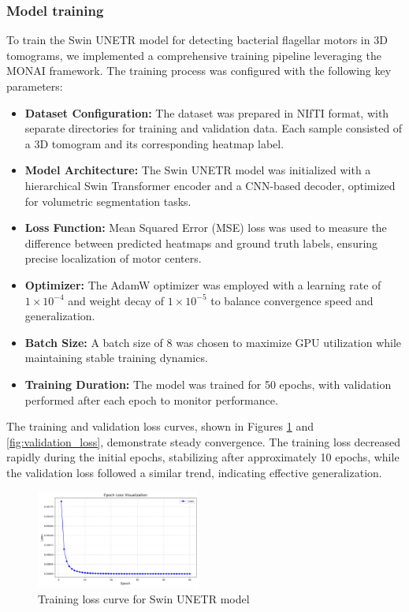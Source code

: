 \documentclass{article}
\begin{document}
\subsubsection{Model training}
To train the Swin UNETR model for detecting bacterial flagellar motors in 3D tomograms, we implemented a comprehensive training pipeline leveraging the MONAI framework. The training process was configured with the following key parameters:

\begin{itemize}
    \item \textbf{Dataset Configuration:} The dataset was prepared in NIfTI format, with separate directories for training and validation data. Each sample consisted of a 3D tomogram and its corresponding heatmap label.
    \item \textbf{Model Architecture:} The Swin UNETR model was initialized with a hierarchical Swin Transformer encoder and a CNN-based decoder, optimized for volumetric segmentation tasks.
    \item \textbf{Loss Function:} Mean Squared Error (MSE) loss was used to measure the difference between predicted heatmaps and ground truth labels, ensuring precise localization of motor centers.
    \item \textbf{Optimizer:} The AdamW optimizer was employed with a learning rate of $1 \times 10^{-4}$ and weight decay of $1 \times 10^{-5}$ to balance convergence speed and generalization.
    \item \textbf{Batch Size:} A batch size of 8 was chosen to maximize GPU utilization while maintaining stable training dynamics.
    \item \textbf{Training Duration:} The model was trained for 50 epochs, with validation performed after each epoch to monitor performance.
\end{itemize}

The training and validation loss curves, shown in Figures \ref{fig:training_loss} and \ref{fig:validation_loss}, demonstrate steady convergence. The training loss decreased rapidly during the initial epochs, stabilizing after approximately 10 epochs, while the validation loss followed a similar trend, indicating effective generalization.

\begin{figure}[htb]
    \centering
    \includegraphics[width=0.48\textwidth]{images/unet_train_epoch_loss_visualization.png}
    \caption{Training loss curve for Swin UNETR model}
    \label{fig:training_loss}
\end{figure}
\end{document}
